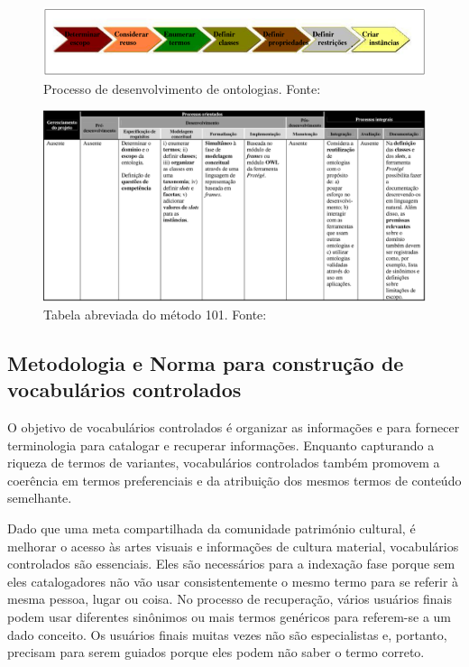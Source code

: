 \pagebreak

\begin{figure}[h] 
\centering 
\includegraphics[scale=0.6]{Figuras/11.png} 
\caption[Processo de desenvolvimento de ontologias.]{Processo de desenvolvimento de ontologias. Fonte: \cite{DanielaLucas2008}}
\label{fig:processo_101}
\end{figure}

\begin{figure}[h] 
\centering 
\includegraphics[scale=0.4]{Figuras/12.png} 
\caption[Tabela abreviada do método 101]{Tabela abreviada do método 101. Fonte: \cite{DanielaLucas2008}}
\end{figure}



\subsection{Metodologia e Norma para construção de vocabulários controlados} 
 O objetivo de vocabulários controlados é organizar as informações e
para fornecer terminologia para catalogar e recuperar informações. Enquanto
capturando a riqueza de termos de variantes, vocabulários controlados também
promovem a coerência em termos preferenciais e da atribuição dos mesmos termos de conteúdo semelhante.
	
Dado que uma meta compartilhada da comunidade património cultural,
é melhorar o acesso às artes visuais e informações de cultura material,
vocabulários controlados são essenciais. Eles são necessários para a indexação
fase porque sem eles catalogadores não vão usar consistentemente o mesmo
termo para se referir à mesma pessoa, lugar ou coisa. No processo de recuperação,
vários usuários finais podem usar diferentes sinônimos ou mais termos genéricos para
referem-se a um dado conceito. Os usuários finais muitas vezes não são especialistas e, portanto, precisam para
serem guiados porque eles podem não saber o termo correto.

